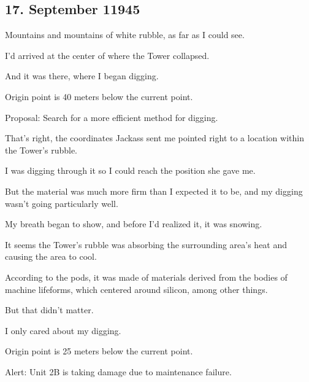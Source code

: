 \subsection{17. September 11945}
\begin{play}
  Mountains and mountains of white rubble, as far as I could see.

  I'd arrived at the center of where the Tower collapsed.

  And it was there, where I began digging.

  Origin point is 40 meters below the current point.

  Proposal: Search for a more efficient method for digging.

  That's right, the coordinates Jackass sent me pointed right to a location within the Tower's rubble.

  I was digging through it so I could reach the position she gave me.

  But the material was much more firm than I expected it to be, and my digging wasn't going particularly well.

  My breath began to show, and before I'd realized it, it was snowing.

  It seems the Tower's rubble was absorbing the surrounding area's heat and causing the area to cool.

  According to the pods, it was made of materials derived from the bodies of machine lifeforms, which centered around silicon, among other things.

  But that didn't matter.

  I only cared about my digging.

  Origin point is 25 meters below the current point.

  Alert: Unit 2B is taking damage due to maintenance failure.


\end{play}
